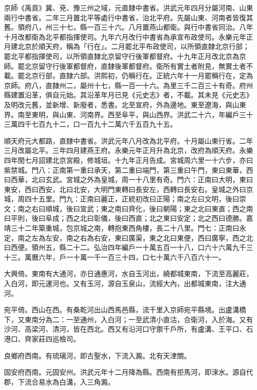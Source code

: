京師《禹貢》冀、兗、豫三州之域，元直隸中書省。洪武元年四月分屬河南、山東兩行中書省。二年三月置北平等處行中書省，治北平府。先屬山東、河南者皆復其舊。領府八，州三十七，縣一百三十六。八月置燕山都衛。與行中書省同治。八年十月改都衛為北平都指揮使司。九年六月改行中書省為承宣布政使司。永樂元年正月建北京於順天府，稱為「行在」。二月罷北平布政使司，以所領直隸北京行部；罷北平都指揮使司，以所領直隸北京留守行後軍都督府。十九年正月改北京為京師。罷北京留守行後軍都督府，直隸後軍都督府。衛所有實土者附見，無實土者不載。罷北京行部，直隸六部。洪熙初，仍稱行在。正統六年十一月罷稱行在，定為京師。府八，直隸州二，屬州十七，縣一百一十六。為里三千二百三十有奇。府州縣建置沿革，俱自元始。其沿革年月已見《元史志》者，不載。其未見《元史志》及明改元舊，並新增、新廢者，悉書。北至宣府，外為邊地。東至遼海，與山東界。南至東明，與山東、河南界。西至阜平，與山西界。洪武二十六，年編戶三十三萬四千七百九十二，口一百九十二萬六千五百九十五。

順天府元大都路，直隸中書省。洪武元年八月改為北平府。十月屬山東行省。二年三月改屬北平。三年四月建燕王府。永樂元年正月升為北京，改府為順天府。永樂四年閏七月詔建北京宮殿，修城垣。十九年正月告成。宮城周六里一十六步，亦曰紫禁城。門八：正南第一重曰承天，第二重曰端門，第三重曰午門，東曰東華，西曰西華，北曰玄武。宮城之外為皇城，周一十八里有奇。門六：正南曰大明，東曰東安，西曰西安，北曰北安，大明門東轉曰長安左，西轉曰長安右。皇城之外曰京城，周四十五里。門九：正南曰麗正，正統初改曰正陽；南之左曰文明，後曰崇文；南之右曰順城，後曰宣武；東之南曰齊化，後曰朝陽；東之北曰東直；西之南曰平則，後曰阜成；西之北曰彰儀，後曰西直；北之東曰安定；北之西曰德勝。嘉靖三十二年築重城，包京城之南，轉抱東西角樓，長二十八里。門七：正南曰永定，南之左為左安，南之右為右安，東曰廣渠，東之北曰東便，西曰廣寧，西之北曰西便。領州五，縣二十二。弘治四年編戶一十萬五百一十八，口六十六萬九千三十三。萬曆六年，戶一十萬一千一百三十四，口七十萬六千八百六十一。

大興倚。東南有大通河，亦日通惠河，水自玉河出，繞都城東南，下流至高麗莊，入白河，即元運河也。又有玉河，源自玉泉山，流經大內，出都城東南，注大通河。

宛平倚。西山在西。有桑乾河出山西馬邑縣，流千里入京師宛平縣境。出盧溝橋下，又東南分為二：一至通州，入白河；一至武清小直沽，合衛河，入於海。又有沙河、高梁河、清河，皆在西北。西又有沿河口守禦千戶所，有盧溝、王平口、石港口、齊家莊四巡檢司。

良鄉府西南。有琉璃河，即古聖水，下流入澱。北有天津關。

固安府西南。元固安州。洪武元年十二月降為縣。西南有拒馬河，即淶水。源自代郡，下流合易水為白溝，入三角澱。

